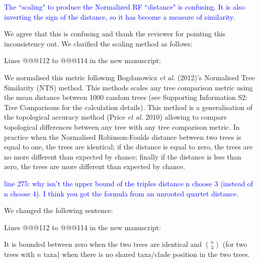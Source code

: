 \documentclass[11pt]{letter}
\begin{document}
\begin{letter}{}


\textcolor{blue}{The ``scaling" to produce the Normalized RF ``distance" is confusing. It is also inverting the sign of the distance, so it has become a measure of similarity.}

We agree that this is confusing and thank the reviewer for pointing this inconsistency out. 
We clarified the scaling method as follows: %

Lines @@@112 to @@@114 in the new manuscript:

\hfill\begin{minipage}{\dimexpr\textwidth-1cm}
We normalised this metric following Bogdanowicz \textit{et al.} (2012)'s Normalised Tree Similarity (NTS) method. This methods scales %
any tree comparison metric using the mean distance between 1000 random trees (see Supporting Information S2: Tree Comparisons for the calculation details). This method is a generalisation of the topological accuracy method (Price \textit{et al.} 2010) allowing to compare topological differences between any tree with any tree comparison metric. In practice when the Normalised Robinson-Foulds distance between two trees is equal to one, the trees are identical; if the distance is equal to zero, the trees are no more different than expected by chance; finally if the distance is less than zero, the trees are more different than expected by chance.
\end{minipage}




\textcolor{blue}{line 275: why isn't the upper bound of the triples distance n choose 3 (instead of n choose 4). I think you got the formula from an unrooted quartet distance.}

We changed the following sentence: %

Lines @@@112 to @@@114 in the new manuscript:

\hfill\begin{minipage}{\dimexpr\textwidth-1cm}
It is bounded between zero when the two trees are identical and $\binom{n}{3}$ (for two trees with $n$ taxa) when there is no shared taxa/clade position in the two trees.
\end{minipage}



\end{letter}
\end{document}
